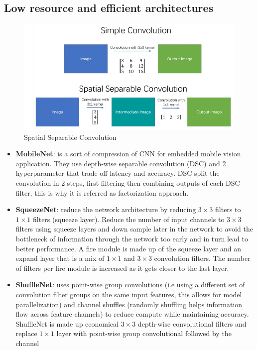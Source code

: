 \subsection{Low resource and efficient architectures}
\begin{figure}[!ht]
    \centering
    \includegraphics[width=0.5\linewidth]{img/CNN/spatialConv.png}
    \caption{Spatial Separable Convolution}
    \label{fig:spatialConv}
\end{figure}
\begin{itemize}
    \item \textbf{MobileNet}: is a sort of compression of CNN for embedded mobile
          vision application. They use depth-wise separable convolution (DSC) and
          2 hyperparameter that trade off latency and accuracy. DSC split the
          convolution in 2 steps, first filtering then combining outputs of each
          DSC filter, this is why it is referred as factorization approach.
    \item \textbf{SqueezeNet}: reduce the network architecture by reducing $3 \times 3$
          filters to $1\times1$ filters (squeeze layer). Reduce the number of
          input channels to $3 \times 3$ filters using squeeze layers and down
          sample later in the network to avoid the bottleneck of information
          through the network too early and in turn lead to better performance.
          A fire module is made up of the squeeze layer and an expand layer that
          is a mix of $1 \times 1$ and $3 \times 3$ convolution filters. The number
          of filters per fire module is increased as it gets closer to the
          last layer.
    \item \textbf{ShuffleNet}: uses point-wise group convolutions (i.e using a
          different set of convolution filter groups on the same input features,
          this allows for model parallelization) and channel shuffles (randomly
          shuffling helps information flow across feature channels) to reduce
          compute while maintaining accuracy. ShuffleNet is made up economical
          $3 \times 3$ depth-wise convolutional filters and replace $1 \times 1$
          layer with point-wise group convolutional followed by the channel

\end{itemize}
